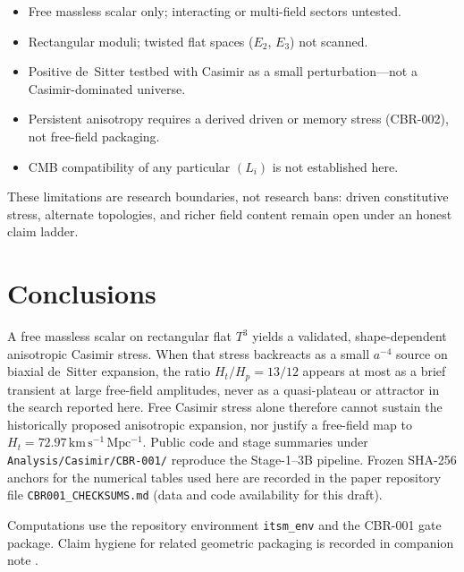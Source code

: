 \documentclass[aps,prd,reprint,superscriptaddress,nofootinbib,floatfix]{revtex4-2}
\newcommand{\Tthree}{T^{3}}
\newcommand{\Ht}{H_{t}}
\newcommand{\Hp}{H_{p}}
\begin{document}
\begin{itemize}
\item Free massless scalar only; interacting or multi-field sectors untested.
\item Rectangular moduli; twisted flat spaces (\(E_2\), \(E_3\)) not scanned.
\item Positive de~Sitter testbed with Casimir as a small perturbation---not a
Casimir-dominated universe.
\item Persistent anisotropy requires a derived driven or memory stress
(CBR-002), not free-field packaging.
\item CMB compatibility of any particular \((L_i)\) is not established here.
\end{itemize}

These limitations are research boundaries, not research bans: driven
constitutive stress, alternate topologies, and richer field content remain
open under an honest claim ladder.

\section{Conclusions}
\label{sec:concl}

A free massless scalar on rectangular flat \(\Tthree\) yields a validated,
shape-dependent anisotropic Casimir stress.
When that stress backreacts as a small \(a^{-4}\) source on biaxial de~Sitter
expansion, the ratio \(\Ht/\Hp=13/12\) appears at most as a brief transient at
large free-field amplitudes, never as a quasi-plateau or attractor in the
search reported here.
Free Casimir stress alone therefore cannot sustain the historically proposed
anisotropic expansion, nor justify a free-field map to
\(H_t=72.97\,\mathrm{km\,s^{-1}\,Mpc^{-1}}\).
Public code and stage summaries under \texttt{Analysis/Casimir/CBR-001/}
reproduce the Stage-1--3B pipeline.
Frozen SHA-256 anchors for the numerical tables used here are recorded in the
paper repository file \texttt{CBR001\_CHECKSUMS.md} (data and code availability
for this draft).

\begin{acknowledgments}
Computations use the repository environment \texttt{itsm\_env} and the
CBR-001 gate package.
Claim hygiene for related geometric packaging is recorded in companion note
\cite{boyd_p1}.
\end{acknowledgments}

\appendix
\end{document}
